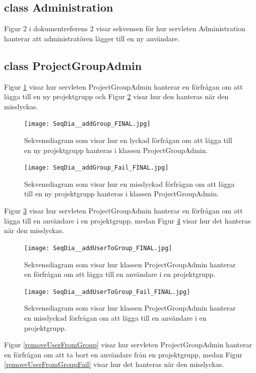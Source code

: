 \documentclass[a4paper]{article}
\begin{document}
\subsection{class Administration}
Figur 2 i dokumentreferens 2 visar sekvensen för hur servleten Administration hanterar att administratören lägger till en ny användare.


\subsection{class ProjectGroupAdmin}
Figur \ref{addGroup} visar hur servleten ProjectGroupAdmin hanterar en förfrågan om att lägga till en ny projektgrupp och Figur \ref{addGroupFail} visar hur den hanteras när den misslyckas. 

\begin{figure}[h!]
\centering
\texttt{[image: SeqDia\_\_addGroup\_FINAL.jpg]}
\caption{Sekvensdiagram som visar hur en lyckad förfrågan om att lägga till en ny projektgrupp hanteras i klassen ProjectGroupAdmin. \label{addGroup}}
\end{figure}

\begin{figure}[h!]
\centering
\texttt{[image: SeqDia\_\_addGroup\_Fail\_FINAL.jpg]}
\caption{Sekvensdiagram som visar hur en misslyckad förfrågan om att lägga till en ny projektgrupp hanteras i klassen ProjectGroupAdmin. \label{addGroupFail}}
\end{figure}

\noindent
Figur \ref{addUserToGroup} visar hur servleten ProjectGroupAdmin hanterar en förfrågan om att lägga till en användare i en projektgrupp, medan Figur \ref{addUserToGroupFail} visar hur det hanteras när den misslyckas.

\begin{figure}[h!]
\centering
\texttt{[image: SeqDia\_\_addUserToGroup\_FINAL.jpg]}
\caption{Sekvensdiagram som visar hur klassen ProjectGroupAdmin hanterar en förfrågan om att lägga till en användare i en projektgrupp.
\label{addUserToGroup}}
\end{figure}

\begin{figure}[h!]
\centering
\texttt{[image: SeqDia\_\_addUserToGroup\_Fail\_FINAL.jpg]}
\caption{Sekvensdiagram som visar hur klassen ProjectGroupAdmin hanterar en misslyckad förfrågan om att lägga till en användare i en projektgrupp.
\label{addUserToGroupFail}}
\end{figure}

\noindent
Figur \ref{removeUserFromGroup} visar hur servleten ProjectGroupAdmin hanterar en förfrågan om att ta bort en användare från en projektgrupp, medan Figur \ref{removeUserFromGroupFail} visar hur det hanteras när den misslyckas.
\end{document}

